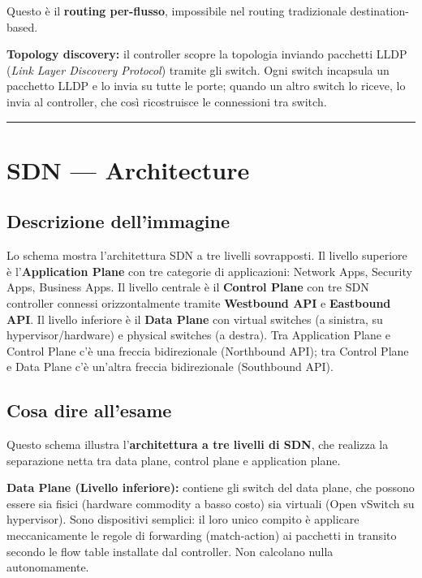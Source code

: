 \documentclass[
  italian,
  openany]{book}
\begin{document}
Questo è il \textbf{routing per-flusso}, impossibile nel routing
tradizionale destination-based.

\textbf{Topology discovery:} il controller scopre la topologia inviando
pacchetti LLDP (\emph{Link Layer Discovery Protocol}) tramite gli
switch. Ogni switch incapsula un pacchetto LLDP e lo invia su tutte le
porte; quando un altro switch lo riceve, lo invia al controller, che
così ricostruisce le connessioni tra switch.

\begin{center}\rule{0.5\linewidth}{0.5pt}\end{center}

\section{SDN --- Architecture}\label{sdn-architecture}

\subsection{Descrizione dell'immagine}\label{descrizione-dellimmagine-8}

Lo schema mostra l'architettura SDN a tre livelli sovrapposti. Il
livello superiore è l'\textbf{Application Plane} con tre categorie di
applicazioni: Network Apps, Security Apps, Business Apps. Il livello
centrale è il \textbf{Control Plane} con tre SDN controller connessi
orizzontalmente tramite \textbf{Westbound API} e \textbf{Eastbound API}.
Il livello inferiore è il \textbf{Data Plane} con virtual switches (a
sinistra, su hypervisor/hardware) e physical switches (a destra). Tra
Application Plane e Control Plane c'è una freccia bidirezionale
(Northbound API); tra Control Plane e Data Plane c'è un'altra freccia
bidirezionale (Southbound API).

\subsection{Cosa dire all'esame}\label{cosa-dire-allesame-8}

Questo schema illustra l'\textbf{architettura a tre livelli di SDN}, che
realizza la separazione netta tra data plane, control plane e
application plane.

\textbf{Data Plane (Livello inferiore):} contiene gli switch del data
plane, che possono essere sia fisici (hardware commodity a basso costo)
sia virtuali (Open vSwitch su hypervisor). Sono dispositivi semplici: il
loro unico compito è applicare meccanicamente le regole di forwarding
(match-action) ai pacchetti in transito secondo le flow table installate
dal controller. Non calcolano nulla autonomamente.
\end{document}

